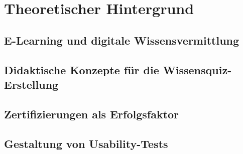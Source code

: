 \chapter{Theoretischer Hintergrund}
\section{E-Learning und digitale Wissensvermittlung}
\section{Didaktische Konzepte für die Wissensquiz-Erstellung}
\section{Zertifizierungen als Erfolgsfaktor}
\section{Gestaltung von Usability-Tests}